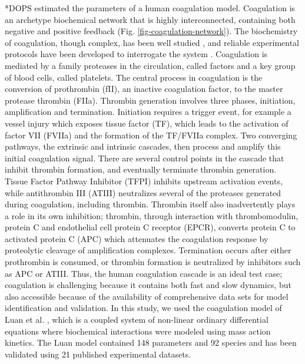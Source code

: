 \documentclass[12pt]{article}
\makeatletter
\renewcommand\subsection{\@startsection
	{subsection}{2}{0mm}
	{-0.05in}
	{-0.5\baselineskip}
	{\normalfont\normalsize\bfseries}}
\makeatother
\begin{document}
\subsection*{DOPS estimated the parameters of a human coagulation model.}
Coagulation is an archetype biochemical network that is highly interconnected, containing both negative and positive feedback (Fig. \ref{fig-coagulation-network}).
The biochemistry of coagulation, though complex, has been well studied \cite{mann2003dynamics,mann2003all,mann2003thrombin,vogler2009contact,diamond2013systems,fogelson2005coagulation,anand2003model},
and reliable experimental protocols have been developed to interrogate the system \cite{hockin2002model,chatterjee2010systems,mann2006models,luan2007computationally}.
Coagulation is mediated by a family proteases in the circulation, called factors and a key group of blood cells, called platelets.
The central process in coagulation is the conversion of prothrombin (fII), an inactive coagulation factor, to the master protease thrombin (FIIa).
Thrombin generation involves three phases, initiation, amplification and termination.
Initiation requires a trigger event, for example a vessel injury which exposes tissue factor (TF), which leads to the activation of factor VII (FVIIa) and the formation of the TF/FVIIa complex.
Two converging pathways, the extrinsic and intrinsic cascades, then process and amplify this initial coagulation signal.
There are several control points in the cascade that inhibit thrombin formation, and eventually terminate thrombin generation.
Tissue Factor Pathway Inhibitor (TFPI) inhibits upstream activation events, while antithrombin III (ATIII) neutralizes several of the proteases generated during coagulation, including thrombin.
Thrombin itself also inadvertently plays a role in its own inhibition; thrombin, through interaction with thrombomodulin, protein C and endothelial cell protein C receptor (EPCR), converts protein C to activated protein C (APC) which attenuates the coagulation response by proteolytic cleavage of amplification complexes.
Termination occurs after either prothrombin is consumed, or thrombin formation is neutralized by inhibitors such as APC or ATIII.
Thus, the human coagulation cascade is an ideal test case;
coagulation is challenging because it contains both fast and slow dynamics, but also accessible because of the availability of comprehensive data sets for model identification and validation.
In this study, we used the coagulation model of Luan et al. \cite{luan2007computationally}, which is a coupled system of non-linear ordinary differential equations where biochemical interactions were modeled using mass action kinetics.
The Luan model contained 148 parameters and 92 species and has been validated using 21 published experimental datasets.
\end{document}

